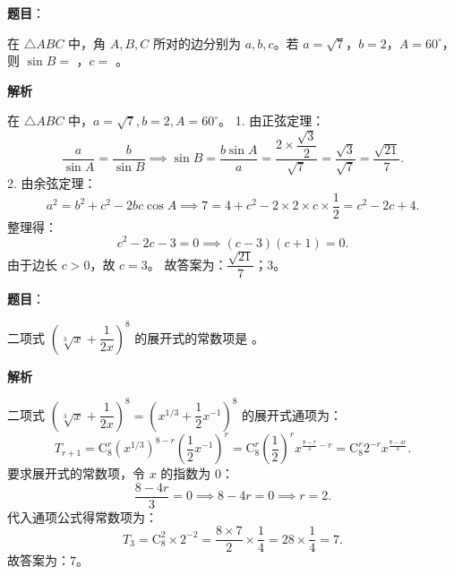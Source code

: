 \begin{answer}

\textbf{题目}：

在 $\triangle ABC$ 中，角 $A, B, C$ 所对的边分别为 $a, b, c$。若 $a = \sqrt7$，$b = 2$，$A = 60^\circ$，则 $\sin B =$ \underline{\hspace{2cm}}，$c =$ \underline{\hspace{2cm}}。

\textbf{解析}

在 $\triangle ABC$ 中，$a = \sqrt7, b = 2, A = 60^\circ$。
1. 由正弦定理：
\nopagebreak[4]
\[\dfrac{a}{\sin A} = \dfrac{b}{\sin B} \implies \sin B = \dfrac{b\sin A}{a} = \dfrac{2 \times \dfrac{\sqrt3}{2}}{\sqrt7} = \dfrac{\sqrt3}{\sqrt7} = \dfrac{\sqrt{21}}{7}.\]
2. 由余弦定理：
\nopagebreak[4]
\[a^2 = b^2 + c^2 - 2bc\cos A \implies 7 = 4 + c^2 - 2 \times 2 \times c \times \dfrac12 = c^2 - 2c + 4.\]
   整理得：
\nopagebreak[4]
\[c^2 - 2c - 3 = 0 \implies (c - 3)(c + 1) = 0.\]
   由于边长 $c > 0$，故 $c = 3$。
故答案为：$\dfrac{\sqrt{21}}{7}$；$3$。


\end{answer}
\begin{answer}

\textbf{题目}：

二项式 $\left(\sqrt[3]{x} + \dfrac{1}{2x}\right)^8$ 的展开式的常数项是 \underline{\hspace{2cm}}。

\textbf{解析}

二项式 $\left(\sqrt[3]{x} + \dfrac{1}{2x}\right)^8 = \left(x^{1/3} + \dfrac12 x^{-1}\right)^8$ 的展开式通项为：
\nopagebreak[4]
\[T_{r+1} = \mathrm C_8^r (x^{1/3})^{8-r} \left(\dfrac12 x^{-1}\right)^r = \mathrm C_8^r \left(\dfrac12\right)^r x^{\frac{8-r}{3} - r} = \mathrm C_8^r 2^{-r} x^{\frac{8-4r}{3}}.\]
要求展开式的常数项，令 $x$ 的指数为 $0$：
\nopagebreak[4]
\[\dfrac{8 - 4r}{3} = 0 \implies 8 - 4r = 0 \implies r = 2.\]
代入通项公式得常数项为：
\nopagebreak[4]
\[T_3 = \mathrm C_8^2 \times 2^{-2} = \dfrac{8 \times 7}{2} \times \dfrac14 = 28 \times \dfrac14 = 7.\]
故答案为：$7$。


\end{answer}
